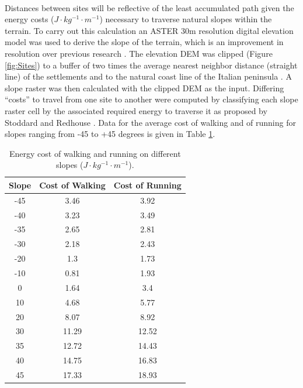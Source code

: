 \documentclass[12pt,a4paper]{thesis}
\begin{document}
\paragraph{}	
Distances between sites will be reflective of the least accumulated path given the energy costs ($J\cdot kg^{-1}\cdot m^{-1}$) necessary to traverse natural slopes within the terrain. To carry out this calculation an ASTER 30m resolution digital elevation model was used to derive the slope of the terrain, which is an improvement in resolution over previous research \citep{StoRed11}. The elevation DEM was clipped (Figure \ref{fig:Sites}) to a buffer of two times the average nearest neighbor distance (straight line) of the settlements and to the natural coast line of the Italian peninsula \citep[167]{StoRed11}. A slope raster was then calculated with the clipped DEM as the input. Differing ``costs'' to travel from one site to another were computed by classifying each slope raster cell by the associated required energy to traverse it as proposed by Stoddard and Redhouse \citeyearpar{StoRed11}. Data for the average cost of walking and of running for slopes ranging from -45 to +45 degrees \citep{Min02} is given in Table \ref{tab:CostData}.   

\begin{table}
\centering
\caption{Energy cost of walking and running on different slopes ($J\cdot kg^{-1}\cdot m^{-1}$).}
\begin{tabular}{|c|c|c|}
\hline Slope & Cost of Walking & Cost of Running \\ 
\hline -45 & 3.46 & 3.92 \\ 
\hline -40 & 3.23 & 3.49 \\ 
\hline -35 & 2.65 & 2.81 \\ 
\hline -30 & 2.18 & 2.43 \\ 
\hline -20 & 1.3 & 1.73 \\ 
\hline -10 & 0.81 & 1.93 \\ 
\hline 0 & 1.64 & 3.4 \\ 
\hline 10 & 4.68 & 5.77 \\ 
\hline 20 & 8.07 & 8.92 \\ 
\hline 30 & 11.29 & 12.52 \\ 
\hline 35 & 12.72 & 14.43 \\ 
\hline 40 & 14.75 & 16.83 \\ 
\hline 45 & 17.33 & 18.93 \\ 
\hline 
\end{tabular} 
\label{tab:CostData}
\end{table}
\end{document}
